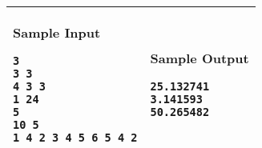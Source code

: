 \begin{table}[!h]
\centering
\begin{tabular}{|l|l|}
\hline
\begin{minipage}[t]{3in}
\textbf{Sample Input}
\begin{verbatim}
3
3 3
4 3 3
1 24
5
10 5
1 4 2 3 4 5 6 5 4 2
\end{verbatim}
\vspace{1mm}
\end{minipage}
&

\begin{minipage}[t]{3in}
\textbf{Sample Output}
\begin{verbatim}
25.132741
3.141593
50.265482
\end{verbatim}
\vspace{1mm}
\end{minipage} \\
\hline
\end{tabular}
\end{table}

\newpage

